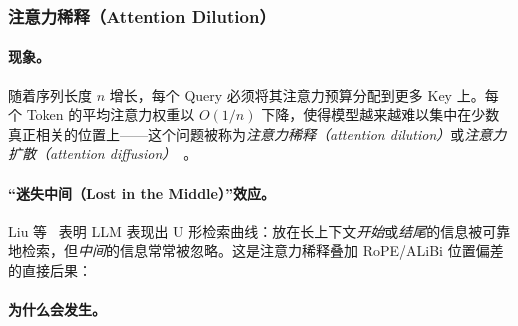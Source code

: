 \subsubsection{注意力稀释（Attention Dilution）}
\label{attention-dilution}

\paragraph{现象。}
\label{the-phenomenon.-1}

随着序列长度 $n$ 增长，每个 Query 必须将其注意力预算分配到更多 Key 上。每个 Token 的平均注意力权重以 $O(1/n)$ 下降，使得模型越来越难以集中在少数真正相关的位置上——这个问题被称为\emph{注意力稀释（attention dilution）}或\emph{注意力扩散（attention diffusion）}~\cite{liu2024lost}。

\paragraph{``迷失中间（Lost in the Middle）''效应。}
\label{the-lost-in-the-middle-effect.}

Liu 等~\cite{liu2024lost} 表明 LLM 表现出 U 形检索曲线：放在长上下文\emph{开始}或\emph{结尾}的信息被可靠地检索，但\emph{中间}的信息常常被忽略。这是注意力稀释叠加 RoPE/ALiBi 位置偏差的直接后果：

\paragraph{为什么会发生。}
\label{why-it-happens.-1}

